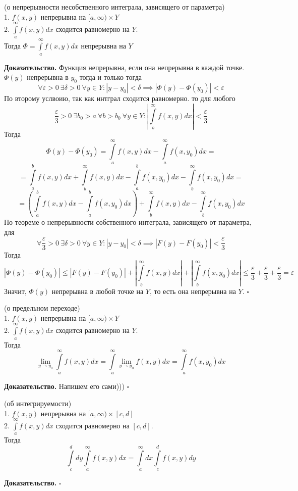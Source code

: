 \begin{theor}
    (о непрерывности несобственного интеграла, зависящего от параметра)\\
    1. $f(x,y)$ непрерывна на  $[a,\infty)\times Y$\\
    2. $\int\limits_{a}^{\infty} f(x,y)dx$ сходится равномерно на $Y$.\\
    Тогда  $\Phi=\int\limits_{a}^{\infty} f(x,y)dx$ непрерывна на $Y$
\end{theor}
\textbf{Доказательство.} 
Функция непрерывна, если она непрерывна в каждой точке. 
$\Phi(y)$ непрерывна в  $y_0$ тогда и только тогда
$$\forall \varepsilon>0~\exists \delta>0~\forall y\in Y:
|y-y_0|<\delta \implies |\Phi(y)-\Phi(y_0)|<\varepsilon$$
По второму услвоию, так как интграл сходится равномерно. то
для любого 
 $$\frac{\varepsilon}{3}>0~\exists b_0>a~\forall b>b_0~\forall y\in Y:
\left|\int\limits_{b}^{\infty} f(x,y)dx\right|<\frac{\varepsilon}{3}
 $$
Тогда 
$$
\Phi(y)-\Phi(y_0)=\int\limits_{a}^{\infty} f(x,y)dx-
\int\limits_{a}^{\infty} f(x,y_0)dx=
$$
$$
=\int\limits_{a}^{b} f(x,y)dx+ \int\limits_{b}^{\infty}f(x,y)dx -
\int\limits_{a}^{b} f(x,y_0)dx -\int\limits_{b}^{\infty}f(x,y_0)dx=
$$
$$
=\left( \int\limits_{a}^{b} f(x,y)dx-\int\limits_{a}^{b} f(x,y_0)dx\right) +
\int\limits_{b}^{\infty}f(x,y)dx-\int\limits_{b}^{\infty}f(x,y_0)dx
$$
По теореме о непрерывности собственного интеграла, зависящего от параметра, 
для
$$
\forall \frac{\varepsilon}{3}>0~\exists \delta>0~\forall y\in Y:
|y-y_0|<\delta \implies |F(y)-F(y_0)|<\frac{\varepsilon}{3}
$$
Тогда 
$$|\Phi(y)-\Phi(y_0)|\leqslant |F(y)-F(y_0)|+ 
\left|\int\limits_{b}^{\infty}f(x,y)dx  \right| + 
\left|\int\limits_{b}^{\infty}f(x,y_0)dx \right|\leqslant 
\frac{\varepsilon}{3}+\frac{\varepsilon}{3}+\frac{\varepsilon}{3}=
\varepsilon$$
Значит, $\Phi(y)$ непрерывна в любой точке на $Y$, то есть она непрерывна
на $Y$. $\square$ 
\begin{theor}
    (о предельном переходе)\\
    1. $f(x,y)$ непрерывна на  $[a,\infty)\times Y$\\
    2. $\int\limits_{a}^{\infty} f(x,y)dx$ сходится равномерно на $Y$.\\
    Тогда  
$$\lim\limits_{y \to y_0}\int\limits_{a}^{\infty} f(x,y)dx=
\int\limits_{a}^{\infty} \lim\limits_{y \to y_0}f(x,y)dx = 
\int\limits_{a}^{\infty}f(x,y_0)dx$$
\end{theor}
\textbf{Доказательство.}  Напишем его сами)))
$\square$ 
\begin{theor}
    (об интегрируемости)\\
    1. $f(x,y)$ непрерывна на  $[a,\infty)\times [c,d]$\\
    2. $\int\limits_{a}^{\infty} f(x,y)dx$ сходится равномерно на $[c,d]$.\\
    Тогда 
    $$\int\limits_{c}^{d}dy \int\limits_{a}^{\infty}f(x,y)dx =
    \int\limits_{a}^{\infty}dx \int\limits_{c}^{d}f(x,y)dy$$
\end{theor}
\textbf{Доказательство.}  
$\square$ \\








